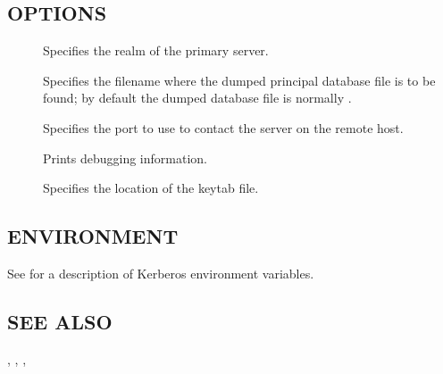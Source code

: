 \documentclass[letterpaper,10pt,english]{sphinxmanual}
\begin{document}
\subsection{OPTIONS}
\label{\detokenize{admin/admin_commands/kprop:options}}\begin{description}
\item[{ }] \leavevmode
Specifies the realm of the primary server.

\item[{ }] \leavevmode
Specifies the filename where the dumped principal database file is
to be found; by default the dumped database file is normally
{\hyperref[\detokenize{mitK5defaults:paths}]{}}.

\item[{ }] \leavevmode
Specifies the port to use to contact the {\hyperref[\detokenize{admin/admin_commands/kpropd:kpropd-8}]{}} server
on the remote host.

\item[{}] \leavevmode
Prints debugging information.

\item[{ }] \leavevmode
Specifies the location of the keytab file.

\end{description}


\subsection{ENVIRONMENT}
\label{\detokenize{admin/admin_commands/kprop:environment}}
See  for a description of Kerberos environment
variables.


\subsection{SEE ALSO}
\label{\detokenize{admin/admin_commands/kprop:see-also}}
{\hyperref[\detokenize{admin/admin_commands/kpropd:kpropd-8}]{}}, {\hyperref[\detokenize{admin/admin_commands/kdb5_util:kdb5-util-8}]{}}, {\hyperref[\detokenize{admin/admin_commands/krb5kdc:krb5kdc-8}]{}},
\end{document}
